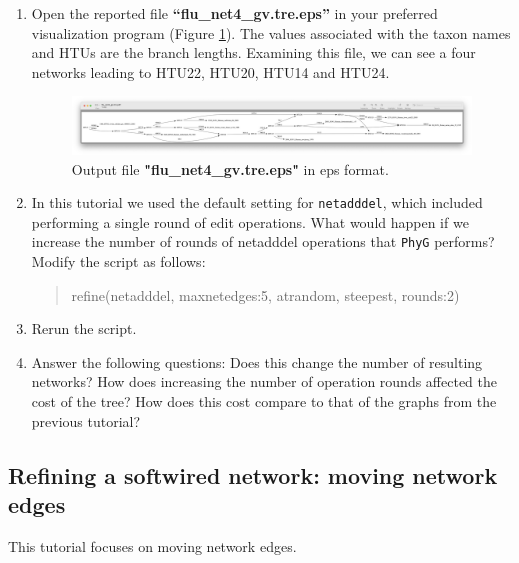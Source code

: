 \documentclass[11pt]{article}
\newcommand{\phyg}{\texttt{PhyG} }
\begin{document}
\begin {enumerate}
\item  Open the reported file \textbf{``flu\_net4\_gv.tre.eps''} in your preferred
visualization program (Figure \ref{eps4}). The values associated with the taxon 
names and HTUs are the branch lengths. Examining this file, we can see a four
networks leading to HTU22, HTU20, HTU14 and HTU24.

\begin{figure}[H]
\centering
\includegraphics[width=\textwidth]{eps4.png}
\caption{Output file \textbf{"flu\_net4\_gv.tre.eps"} in eps format.}
\label{eps4}
\end{figure}

\item In this tutorial we used the default setting for \texttt{netadddel}, which 
included performing a single round of edit operations. What would happen 
if we increase the number of rounds of netadddel operations that \phyg 
performs? \\

Modify the script as follows:

	\begin{quote}
	refine(netadddel, maxnetedges:5, atrandom, steepest, rounds:2)
	\end{quote}
	
\item Rerun the script.

\item Answer the following questions: 
\subitem Does this change the number of resulting networks?
\subitem How does increasing the number of operation rounds affected the 
cost of the tree?
\subitem How does this cost compare to that of the graphs from the previous tutorial?

\end{enumerate}
\subsection{Refining a softwired network: moving network edges}
\label{subsec:softnetmove}

This tutorial focuses on moving network edges.
\end{document}
